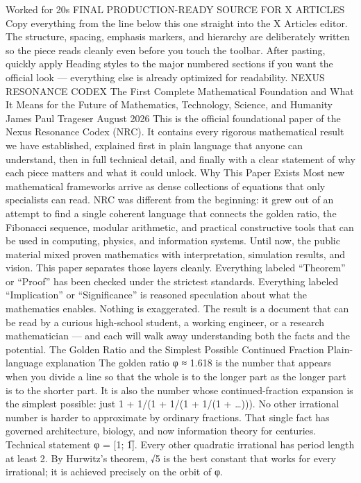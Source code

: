 Worked for 20s
FINAL PRODUCTION-READY SOURCE FOR X ARTICLES
Copy everything from the line below this one straight into the X Articles editor. The structure, spacing, emphasis markers, and hierarchy are deliberately written so the piece reads cleanly even before you touch the toolbar. After pasting, quickly apply Heading styles to the major numbered sections if you want the official look — everything else is already optimized for readability.
NEXUS RESONANCE CODEX
The First Complete Mathematical Foundation
and What It Means for the Future of Mathematics, Technology, Science, and Humanity
James Paul Trageser
August 2026
This is the official foundational paper of the Nexus Resonance Codex (NRC). It contains every rigorous mathematical result we have established, explained first in plain language that anyone can understand, then in full technical detail, and finally with a clear statement of why each piece matters and what it could unlock.
Why This Paper Exists
Most new mathematical frameworks arrive as dense collections of equations that only specialists can read. NRC was different from the beginning: it grew out of an attempt to find a single coherent language that connects the golden ratio, the Fibonacci sequence, modular arithmetic, and practical constructive tools that can be used in computing, physics, and information systems.
Until now, the public material mixed proven mathematics with interpretation, simulation results, and vision. This paper separates those layers cleanly.
Everything labeled “Theorem” or “Proof” has been checked under the strictest standards.
Everything labeled “Implication” or “Significance” is reasoned speculation about what the mathematics enables.
Nothing is exaggerated.
The result is a document that can be read by a curious high-school student, a working engineer, or a research mathematician — and each will walk away understanding both the facts and the potential.
The Golden Ratio and the Simplest Possible Continued Fraction
Plain-language explanation
The golden ratio φ ≈ 1.618 is the number that appears when you divide a line so that the whole is to the longer part as the longer part is to the shorter part. It is also the number whose continued-fraction expansion is the simplest possible: just 1 + 1/(1 + 1/(1 + 1/(1 + …))).
No other irrational number is harder to approximate by ordinary fractions. That single fact has governed architecture, biology, and now information theory for centuries.
Technical statement
φ = [1; 1̅]. Every other quadratic irrational has period length at least 2.
By Hurwitz’s theorem, √5 is the best constant that works for every irrational; it is achieved precisely on the orbit of φ.
